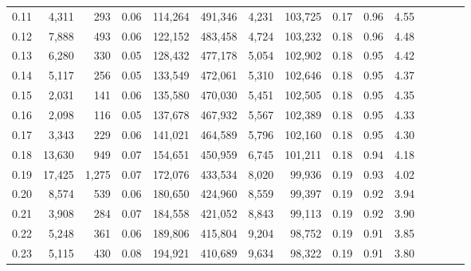 \begin{tabular}{rrrcrrrrrrrrrrr}
0.11 &   4,311 &     293 &                                       0.06 &  114,264 &  491,346 &    4,231 &  103,725 &  0.17 &  0.96 &                         4.55 \\
0.12 &   7,888 &     493 &                                       0.06 &  122,152 &  483,458 &    4,724 &  103,232 &  0.18 &  0.96 &                         4.48 \\
0.13 &   6,280 &     330 &                                       0.05 &  128,432 &  477,178 &    5,054 &  102,902 &  0.18 &  0.95 &                         4.42 \\
0.14 &   5,117 &     256 &                                       0.05 &  133,549 &  472,061 &    5,310 &  102,646 &  0.18 &  0.95 &                         4.37 \\
0.15 &   2,031 &     141 &                                       0.06 &  135,580 &  470,030 &    5,451 &  102,505 &  0.18 &  0.95 &                         4.35 \\
0.16 &   2,098 &     116 &                                       0.05 &  137,678 &  467,932 &    5,567 &  102,389 &  0.18 &  0.95 &                         4.33 \\
0.17 &   3,343 &     229 &                                       0.06 &  141,021 &  464,589 &    5,796 &  102,160 &  0.18 &  0.95 &                         4.30 \\
0.18 &  13,630 &     949 &                                       0.07 &  154,651 &  450,959 &    6,745 &  101,211 &  0.18 &  0.94 &                         4.18 \\
0.19 &  17,425 &   1,275 &                                       0.07 &  172,076 &  433,534 &    8,020 &   99,936 &  0.19 &  0.93 &                         4.02 \\
0.20 &   8,574 &     539 &                                       0.06 &  180,650 &  424,960 &    8,559 &   99,397 &  0.19 &  0.92 &                         3.94 \\
0.21 &   3,908 &     284 &                                       0.07 &  184,558 &  421,052 &    8,843 &   99,113 &  0.19 &  0.92 &                         3.90 \\
0.22 &   5,248 &     361 &                                       0.06 &  189,806 &  415,804 &    9,204 &   98,752 &  0.19 &  0.91 &                         3.85 \\
0.23 &   5,115 &     430 &                                       0.08 &  194,921 &  410,689 &    9,634 &   98,322 &  0.19 &  0.91 &                         3.80 \\

\end{tabular}
